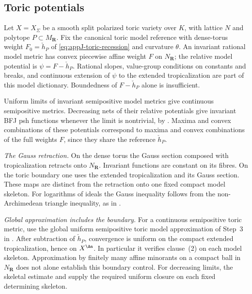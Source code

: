 \subsection{Toric potentials}
\label{sec:ch21-worked-toric}

\begin{example}
\label{ex:ch21-toric}
Let $X=X_\Sigma$ be a smooth split polarized toric variety over $K$,
with lattice $N$ and polytope $P\subset M_{\mathbf R}$.
Fix the canonical toric model reference with dense-torus weight
$F_0=\check h_P$ of \eqref{eq:appJ-toric-recession} and curvature
$\theta$.  An invariant rational model metric has convex piecewise
affine weight $F$ on $N_{\mathbf R}$; the relative model potential is
$\psi=F-\check h_P$.  Rational slopes, value-group conditions on
constants and breaks, and continuous extension of $\psi$ to the extended
tropicalization are part of this model dictionary.  Boundedness of
$F-\check h_P$ alone is insufficient.

Uniform limits of invariant semipositive model metrics give continuous
semipositive metrics.  Decreasing nets of their relative potentials give
invariant BFJ psh functions whenever the limit is nontrivial, by
.  Maxima and convex combinations of
these potentials correspond to maxima and convex combinations of the full
weights $F$, since they share the reference $\check h_P$.

\emph{The Gauss retraction.}  On the dense torus the Gauss section
composed with tropicalization retracts onto $N_{\mathbf R}$.
Invariant functions are constant on its fibres.  On the toric boundary one
uses the extended tropicalization and its Gauss section.  These maps are
distinct from the retraction onto one fixed compact model skeleton.
For logarithms of ideals the Gauss inequality follows from the
non-Archimedean triangle inequality, as in
.

\emph{Global approximation includes the boundary.}  For a continuous
semipositive toric metric, use the global uniform semipositive toric model
approximation of Step~3 in .  After subtraction
of $\check h_P$, convergence is uniform on the compact extended
tropicalization, hence on $X^{\An}$.  In particular it verifies
clause~(2) on each model skeleton.  Approximation by finitely many affine
minorants on a compact ball in $N_{\mathbf R}$ does not alone establish
this boundary control.  For decreasing limits, the skeletal estimate and
 supply the required uniform closure
on each fixed determining skeleton.


\end{example}
